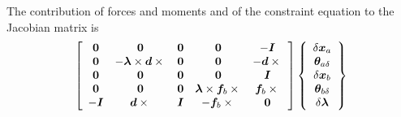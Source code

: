 \documentclass[10pt,dvips,fleqn,subeqn]{report}
\newcommand{\T}[1]{\bm{#1}}
\begin{document}
The contribution of forces and moments and of the constraint equation 
to the Jacobian matrix is
\begin{equation}
	\sqbr{\matr{ccccc}{
		\T{0} & \T{0} & \T{0} & \T{0} & - \T{I} \\
		\T{0} & - \T{\lambda}\times\T{d}\times{} & \T{0} & \T{0} & - \T{d}\times{}\\
		\T{0} & \T{0} & \T{0} & \T{0} & \T{I} \\
		\T{0} & \T{0} & \T{0} & \T{\lambda}\times\T{f}_b\times{} & \T{f}_b\times{} \\
		- \T{I} & \T{d}\times{} & \T{I} & - \T{f}_b\times{} & \T{0}
	}}\cubr{\cvvect{
		\delta\T{x}_a \\
		\T{\theta}_{a\delta} \\
		\delta\T{x}_b \\
		\T{\theta}_{b\delta} \\
		\delta\T{\lambda}
	}}
\end{equation}
\end{document}
